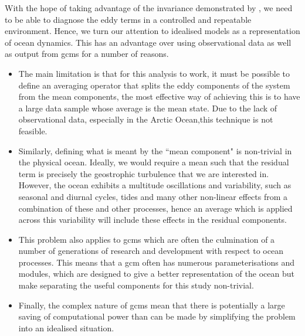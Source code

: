 \documentclass[12pt,a4paper]{report}
\begin{document}
With the hope of taking advantage of the invariance demonstrated by 
\cite{maddison2013eliassen}, we need to be able to diagnose the
eddy terms in a controlled and repeatable environment. Hence, we turn our attention to
idealised models as a representation of ocean dynamics. This has an advantage 
over using observational data as well as output from \glspl{gcm} for a number of reasons.
\begin{itemize}
	\item The main limitation is that for this analysis to work, it must be possible to define an
	averaging operator that splits the eddy components of the system from the mean
	components, the most effective way of achieving this is to have a large data sample
	whose average is the mean state. Due to the lack of observational data, especially in the
	Arctic Ocean,this  technique is not feasible.
	\item Similarly, defining what is meant by the ``mean component" is non-trivial in the physical ocean. Ideally, we would require a mean such that the residual term is precisely the 
	geostrophic turbulence that we are interested in. However, the ocean exhibits a multitude 
	oscillations and variability, such as seasonal and diurnal cycles, tides and many other
	non-linear effects from a combination of these and other processes, hence an average which
	is applied across this variability will include these effects in the residual components.
	\item This problem also applies to \glspl{gcm} which are often the culmination of 
	a number of generations of research and development with respect to ocean processes.
	This means that a \gls{gcm} often has numerous parameterisations and modules, which are
	designed to give a better representation of the ocean but make separating the useful components
	for this study non-trivial. 
	\item Finally, the complex nature of \glspl{gcm} mean that there is potentially a large saving
	of computational power than can be made by simplifying the problem into an idealised situation.
\end{itemize}
\end{document}
